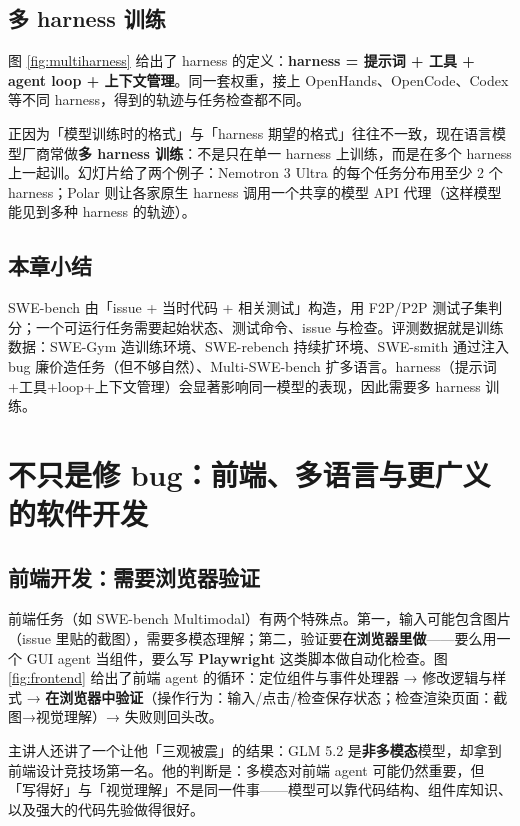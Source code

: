 ﻿\documentclass[a4paper]{article}
\begin{document}
\subsection{多 harness 训练}

图 \ref{fig:multiharness} 给出了 harness 的定义：\textbf{harness = 提示词 + 工具 + agent loop + 上下文管理}。同一套权重，接上 OpenHands、OpenCode、Codex 等不同 harness，得到的轨迹与任务检查都不同。

正因为「模型训练时的格式」与「harness 期望的格式」往往不一致，现在语言模型厂商常做\textbf{多 harness 训练}：不是只在单一 harness 上训练，而是在多个 harness 上一起训。幻灯片给了两个例子：Nemotron 3 Ultra 的每个任务分布用至少 2 个 harness；Polar 则让各家原生 harness 调用一个共享的模型 API 代理（这样模型能见到多种 harness 的轨迹）。

\subsection{本章小结}
SWE-bench 由「issue + 当时代码 + 相关测试」构造，用 F2P/P2P 测试子集判分；一个可运行任务需要起始状态、测试命令、issue 与检查。评测数据就是训练数据：SWE-Gym 造训练环境、SWE-rebench 持续扩环境、SWE-smith 通过注入 bug 廉价造任务（但不够自然）、Multi-SWE-bench 扩多语言。harness（提示词+工具+loop+上下文管理）会显著影响同一模型的表现，因此需要多 harness 训练。

\section{不只是修 bug：前端、多语言与更广义的软件开发}

\subsection{前端开发：需要浏览器验证}

前端任务（如 SWE-bench Multimodal）有两个特殊点。第一，输入可能包含图片（issue 里贴的截图），需要多模态理解；第二，验证要\textbf{在浏览器里做}——要么用一个 GUI agent 当组件，要么写 \textbf{Playwright} 这类脚本做自动化检查。图 \ref{fig:frontend} 给出了前端 agent 的循环：定位组件与事件处理器 → 修改逻辑与样式 → \textbf{在浏览器中验证}（操作行为：输入/点击/检查保存状态；检查渲染页面：截图→视觉理解）→ 失败则回头改。

主讲人还讲了一个让他「三观被震」的结果：GLM 5.2 是\textbf{非多模态}模型，却拿到前端设计竞技场第一名。他的判断是：多模态对前端 agent 可能仍然重要，但「写得好」与「视觉理解」不是同一件事——模型可以靠代码结构、组件库知识、以及强大的代码先验做得很好。
\end{document}
